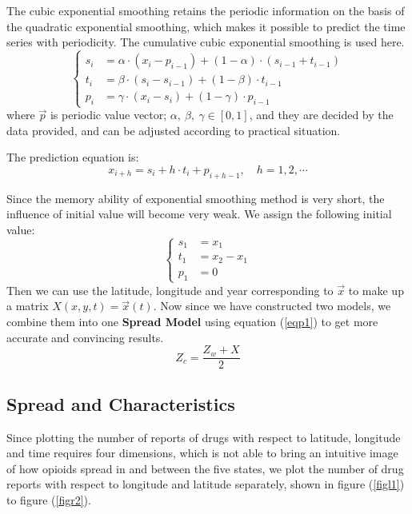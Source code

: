 \documentclass{mcmthesis}
\numberwithin{equation}{section}
\numberwithin{figure}{section}
\numberwithin{table}{section}
\theoremstyle{mydef}
\begin{document}
The cubic exponential smoothing retains the periodic information on the basis of the quadratic exponential smoothing, which makes it possible to predict the time series with periodicity. The cumulative cubic exponential smoothing is used here.
\begin{equation}
\left\{
\begin{aligned}
s_i&=\alpha \cdot (x_i-p_{i-1})+(1-\alpha)\cdot(s_{i-1}+t_{i-1})\\
t_i&=\beta\cdot(s_i-s_{i-1})+(1-\beta)\cdot t_{i-1}\\
p_i&=\gamma\cdot(x_i-s_i)+(1-\gamma)\cdot p_{i-1}
\end{aligned}
\right.
\end{equation}
where $\vec{p}$ is periodic value vector; $\alpha,\ \beta, \ \gamma\in[0,1]$, and they are decided by the data provided, and can be adjusted according to practical situation. 

The prediction equation is:
\begin{equation}
x_{i+h}=s_i+h\cdot t_i+p_{i+h-1}, \quad h = 1,2,\cdots
\end{equation}

Since the memory ability of exponential smoothing method is very short, the influence of initial value will become very weak. We assign the following initial value:
\begin{equation}
\left\{
\begin{aligned}
s_1&=x_1\\
t_1&=x_2-x_1\\
p_1&=0
\end{aligned}
\right.
\end{equation}
Then we can use the latitude, longitude and year corresponding to $\vec{x}$ to make up a matrix $X(x,y,t)=\vec{x}(t)$. Now since we have constructed two models, we combine them into one {\bf{Spread Model}} using equation (\ref{eqp1}) to get more accurate and convincing results.
\begin{equation}
Z_c=\frac{Z_w+X}{2}
\label{eqp1}
\end{equation}

\subsection{Spread and Characteristics}

Since plotting the number of reports of drugs with respect to latitude, longitude and time requires four dimensions, which is not able to bring an intuitive image of how opioids spread in and between the five states, we plot  the number of drug reports with respect to longitude and latitude separately, shown in figure (\ref{figl1}) to figure (\ref{figr2}).
\end{document}
